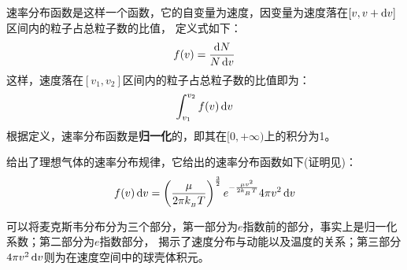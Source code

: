         \subsection[麦克斯韦分布]{}
            速率分布函数是这样一个函数，它的自变量为速度，因变量为速度落在$[v,v+\dif{v}]$区间内的粒子占总粒子数的比值，
            定义式如下：
            \begin{equation}
                f(v) = \frac{\dif{N}}{N\dif{v}}
                \nonumber
            \end{equation}
            这样，速度落在$[v_{1},v_{2}]$区间内的粒子占总粒子数的比值即为：
            \begin{equation}
                \int_{v_{1}}^{v_{2}} f(v)\dif{v}
                \nonumber
            \end{equation}
            根据定义，速率分布函数是\textbf{归一化}的，即其在$[0,+\infty)$上的积分为1。
                
             给出了理想气体的速率分布规律，它给出的速率分布函数如下(证明见)：
            \begin{equation}
                f(v)\dif{v}=\left(\dfrac \mu{2\pi k_{_B}T}\right)^{\frac{3}{2}}e^{-\frac{\mu v^{2}}{2k_{_B}T}}4\pi v^2\dif{v}
                \nonumber
            \end{equation}
            
            可以将麦克斯韦分布分为三个部分，第一部分为$e$指数前的部分，事实上是归一化系数；第二部分为$e$指数部分，
            揭示了速度分布与动能以及温度的关系；第三部分$4\pi v^{2}\dif{v}$则为在速度空间中的球壳体积元。


